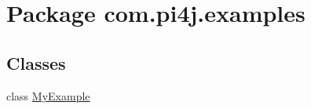 \hypertarget{namespacecom_1_1pi4j_1_1examples}{}\section{Package com.\+pi4j.\+examples}
\label{namespacecom_1_1pi4j_1_1examples}
\subsection*{Classes}
\begin{DoxyCompactItemize}
\item 
class \hyperlink{classcom_1_1pi4j_1_1examples_1_1MyExample}{My\+Example}
\end{DoxyCompactItemize}
